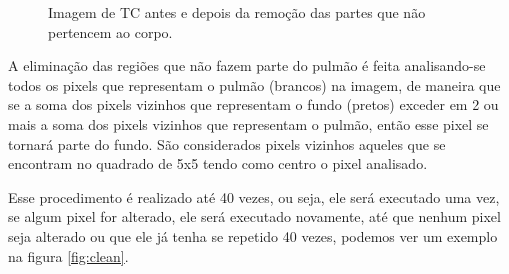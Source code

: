 \begin{figure}[ht]
 \begin{center}
 \end{center}
 \caption{Imagem de TC antes e depois da remoção das partes que não pertencem ao corpo.}
 \label{fig:remocao}
\end{figure}

A eliminação das regiões que não fazem parte do pulmão é feita analisando-se todos os pixels que representam o pulmão (brancos) na imagem, de maneira que se a soma dos pixels vizinhos que representam o fundo (pretos) exceder em 2 ou mais a soma dos pixels vizinhos que representam o pulmão, então esse pixel se tornará parte do fundo. São considerados pixels vizinhos aqueles que se encontram no quadrado de 5x5 tendo como centro o pixel analisado.

Esse procedimento é realizado até 40 vezes, ou seja, ele será executado uma vez, se algum pixel for alterado, ele será executado novamente, até que nenhum pixel seja alterado ou que ele já tenha se repetido 40 vezes, podemos ver um exemplo na figura \ref{fig:clean}.

